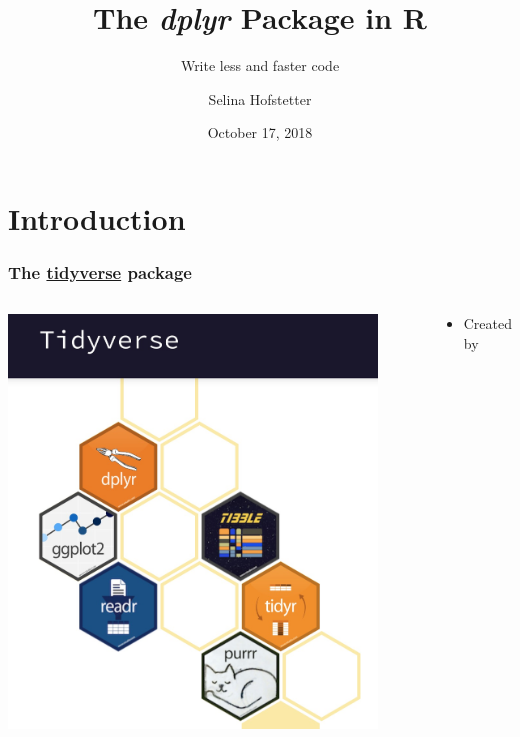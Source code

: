 \documentclass{beamer}
\title[VAM ft. The Replication Project]{\textbf{The \textit{dplyr} Package in R}} %
\subtitle{Write less and faster code}
\author{Selina Hofstetter} %
\institute[LSE] %
{VAM 1 - MT 2018 \\ %
\medskip
\medskip
}
\date{October 17, 2018} %
\begin{document}
\begin{frame}
\titlepage %
\end{frame}


\section{Introduction} 
\begin{frame}
\frametitle{The \href{https://www.tidyverse.org}{tidyverse} package}
\begin{columns}
\begin{center}
\includegraphics[width=0.9\textwidth]{tidy.jpg}
\end{center}
\begin{center}
\begin{itemize}
\item Created by {}
\end{itemize}
\end{center}
\end{columns}
\end{frame}
\end{document}
